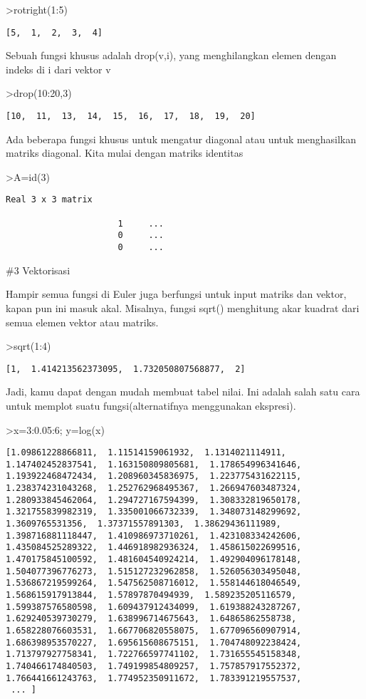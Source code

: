 \documentclass[
]{book}
\begin{document}
\textgreater rotright(1:5)

\begin{verbatim}
[5,  1,  2,  3,  4]
\end{verbatim}

Sebuah fungsi khusus adalah drop(v,i), yang menghilangkan elemen dengan indeks di i dari vektor v

\textgreater drop(10:20,3)

\begin{verbatim}
[10,  11,  13,  14,  15,  16,  17,  18,  19,  20]
\end{verbatim}

Ada beberapa fungsi khusus untuk mengatur diagonal atau untuk menghasilkan matriks diagonal. Kita mulai dengan matriks identitas

\textgreater A=id(3)

\begin{verbatim}
Real 3 x 3 matrix

                      1     ...
                      0     ...
                      0     ...
\end{verbatim}

\#3 Vektorisasi

Hampir semua fungsi di Euler juga berfungsi untuk input matriks dan vektor, kapan pun ini masuk akal. Misalnya, fungsi sqrt() menghitung akar kuadrat dari semua elemen vektor atau matriks.

\textgreater sqrt(1:4)

\begin{verbatim}
[1,  1.414213562373095,  1.732050807568877,  2]
\end{verbatim}

Jadi, kamu dapat dengan mudah membuat tabel nilai. Ini adalah salah satu cara untuk memplot suatu fungsi(alternatifnya menggunakan ekspresi).

\textgreater x=3:0.05:6; y=log(x)

\begin{verbatim}
[1.09861228866811,  1.11514159061932,  1.1314021114911,
1.147402452837541,  1.163150809805681,  1.178654996341646,
1.193922468472434,  1.208960345836975,  1.223775431622115,
1.238374231043268,  1.252762968495367,  1.266947603487324,
1.280933845462064,  1.294727167594399,  1.308332819650178,
1.321755839982319,  1.335001066732339,  1.348073148299692,
1.3609765531356,  1.37371557891303,  1.38629436111989,
1.398716881118447,  1.410986973710261,  1.423108334242606,
1.435084525289322,  1.446918982936324,  1.458615022699516,
1.470175845100592,  1.481604540924214,  1.492904096178148,
1.504077396776273,  1.515127232962858,  1.526056303495048,
1.536867219599264,  1.547562508716012,  1.558144618046549,
1.568615917913844,  1.57897870494939,  1.589235205116579,
1.599387576580598,  1.609437912434099,  1.619388243287267,
1.629240539730279,  1.638996714675643,  1.64865862558738,
1.658228076603531,  1.667706820558075,  1.677096560907914,
1.686398953570227,  1.695615608675151,  1.704748092238424,
1.713797927758341,  1.722766597741102,  1.731655545158348,
1.740466174840503,  1.749199854809257,  1.757857917552372,
1.766441661243763,  1.774952350911672,  1.783391219557537,
 ... ]
\end{verbatim}
\end{document}
